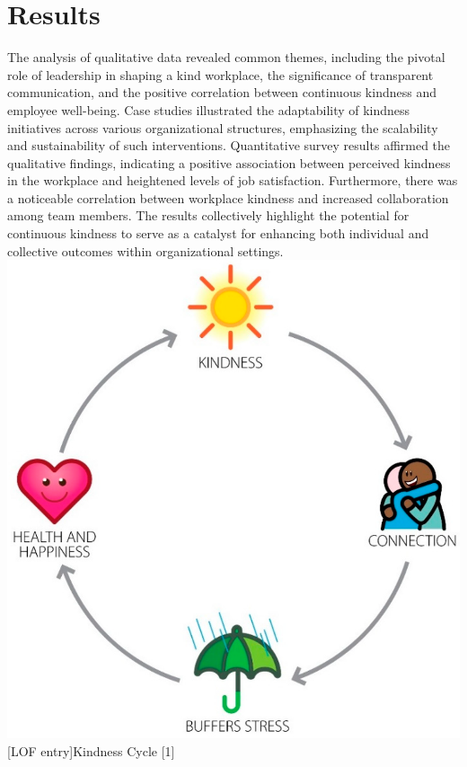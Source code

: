 \documentclass[a4paper, 11pt]{report}
\begin{document}
\section{Results}
The analysis of qualitative data revealed common themes, including the pivotal role of leadership in shaping a kind workplace, the significance of transparent communication, and the positive correlation between continuous kindness and employee well-being. Case studies illustrated the adaptability of kindness initiatives across various organizational structures, emphasizing the scalability and sustainability of such interventions.
\vspace{5mm} %
\newline
Quantitative survey results affirmed the qualitative findings, indicating a positive association between perceived kindness in the workplace and heightened levels of job satisfaction. Furthermore, there was a noticeable correlation between workplace kindness and increased collaboration among team members. The results collectively highlight the potential for continuous kindness to serve as a catalyst for enhancing both individual and collective outcomes within organizational settings.
\vspace{5mm} %
\newline
\includegraphics[width=\textwidth]{behavsci.png}
[LOF entry]{Kindness Cycle [1]} 
\vspace{5mm} %
\end{document}
